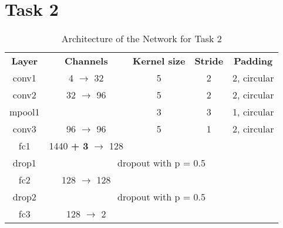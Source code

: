 
\section{Task 2}

\begin{table}[htbp]
	\caption{Architecture of the Network for Task 2}
	\begin{center}
		\begin{tabular}{|c|c|c|c|c|}
			\hline
			\textbf{Layer}&\textbf{Channels} &\textbf{Kernel size} 
			&\textbf{Stride} &\textbf{Padding}\\
			\cline{1-5}
			conv1  &  4 $\rightarrow$ 	32 & 5 & 2 & 2, circular \\ \hline
			conv2  & 32 $\rightarrow$  	96 & 5 & 2 & 2, circular \\ \hline
			mpool1 & 					   & 3	& 3 & 1, circular \\ 
			\hline			
			conv3  & 96 $\rightarrow$  	96 & 5 & 1 & 2, circular \\ \hline
			fc1   &  1440 \textbf{+ 3} $\rightarrow$ 128 &  &  &  \\ \hline
			drop1 & \multicolumn{4}{c|}{dropout with p = 0.5} \\ \hline
			fc2   &  128 $\rightarrow$ 128 &  &  &  \\ \hline
			 drop2 & \multicolumn{4}{c|}{ dropout with p = 0.5} \\ \hline
			fc3 &  128 $\rightarrow$   2 &  &  &  \\ \hline
		\end{tabular}
		\label{tab: task 2}
	\end{center}
\end{table}
